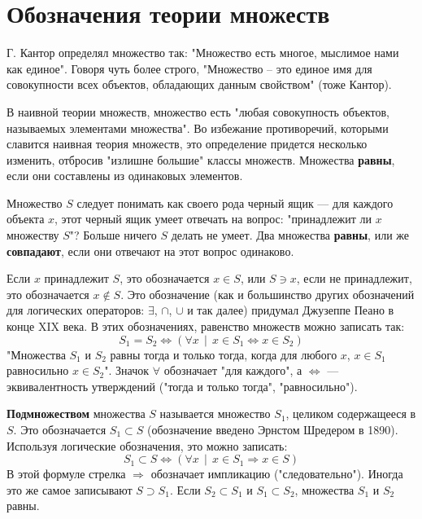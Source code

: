 \documentclass[12pt]{book}
\theoremstyle{upshape}
\theoremstyle{generic}
\theoremstyle{upshapenonumber}
\newcommand{\следствие}{%
     \refstepcounter{teorema}
     {\noindent\bf Следствие \thechapter.\arabic{teorema}:\ }}
\newcommand{\пример}{%
     \refstepcounter{teorema}
     {\noindent\bf Пример \thechapter.\arabic{teorema}:\ }}
\newcommand{\лемма}{%
     \refstepcounter{teorema}
     {\noindent\bf Лемма \thechapter.\arabic{teorema}:\ }}
\newcommand{\теорема}{%
     \refstepcounter{teorema}
     {\noindent\bf Теорема \thechapter.\arabic{teorema}:\ }}
\newcommand{\утверждение}{%
     \refstepcounter{teorema}
     {\noindent\bf Утверждение \thechapter.\arabic{teorema}:\ }}
\def\бф{\bf}
\begin{document}

\section{Обозначения теории множеств}

Г. Кантор определял множество так:
"Множество есть многое, мыслимое нами как единое".
Говоря чуть более строго, "Множество -- это
единое имя для совокупности всех объектов, 
обладающих данным свойством" (тоже Кантор).

В наивной теории множеств,
множество есть "любая совокупность объектов, называемых
элементами множества". Во избежание противоречий,
которыми славится наивная теория множеств, это
определение придется несколько изменить, отбросив
"излишне большие" классы множеств.
Множества {\bf равны}, если они составлены из одинаковых элементов.


Множество $S$ следует понимать как своего рода черный ящик --- 
для каждого объекта $x$, этот черный ящик умеет отвечать
на вопрос: "принадлежит ли $x$ множеству $S$"? 
Больше ничего $S$ делать не умеет. Два множества
{\бф равны}, или же {\бф совпадают},
если они отвечают на этот вопрос одинаково.

Если $x$ принадлежит $S$, это обозначается $x\in S$,
или $S\ni x$, если не принадлежит, это обозначается $x\notin S$.
Это обозначение (как и большинство других обозначений
для логических операторов: $\exists$, $\cap$,
$\cup$ и так далее) придумал Джузеппе Пеано в конце XIX
века. В этих обозначениях, равенство множеств можно записать
так:
\[
S_1 = S_2 \Leftrightarrow 
\left (\forall x \ \ | \ \ x\in S_1 \Leftrightarrow x\in S_2 \right)
\]
"Множества $S_1$ и $S_2$ равны тогда и только тогда, когда для
любого $x$, $x\in S_1$ равносильно $x\in S_2$".
Значок $\forall$ обозначает "для каждого",
а $\Leftrightarrow$ --- эквивалентность 
утверждений ("тогда и только тогда",
"равносильно"). 

{\бф Подмножеством} множества $S$ называется 
множество $S_1$, целиком содержащееся в $S$.
Это обозначается $S_1\subset S$ (обозначение введено
Эрнстом Шредером в 1890). Используя логические обозначения,
это можно записать:
\[
S_1 \subset S \Leftrightarrow 
\left (\forall x \ \ | \ \ x\in S_1 \Rightarrow x\in S \right)
\]
В этой формуле
стрелка $\Rightarrow$ обозначает импликацию ("следовательно").
Иногда это же самое записывают $S\supset S_1$.
Если $S_2\subset S_1$ и $S_1\subset S_2$, множества
$S_1$ и $S_2$ равны. 
\end{document}
